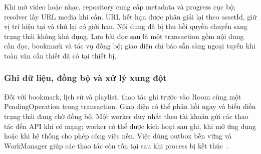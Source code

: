 Khi mở video hoặc nhạc, repository cung cấp metadata và progress cục bộ; resolver lấy URL media khi cần. URL hết hạn được phân giải lại theo assetId, giữ vị trí hiện tại và thử lại có giới hạn. Nội dung đã bị thu hồi quyền chuyển sang trạng thái không khả dụng. Lưu bài đọc sau là một transaction gồm nội dung cần đọc, bookmark và tác vụ đồng bộ; giao diện chỉ báo sẵn sàng ngoại tuyến khi toàn văn cần thiết đã có tại thiết bị.

\subsubsection{Ghi dữ liệu, đồng bộ và xử lý xung đột}
\label{sec:data-synchronization}

Đối với bookmark, lịch sử và playlist, thao tác ghi trước vào Room cùng một PendingOperation trong transaction. Giao diện có thể phản hồi ngay và biểu diễn trạng thái đang chờ đồng bộ. Một worker duy nhất theo tài khoản gửi các thao tác đến API khi có mạng; worker có thể được kích hoạt sau ghi, khi mở ứng dụng hoặc khi hệ thống cho phép công việc nền. Việc dùng outbox bền vững và WorkManager giúp các thao tác còn tồn tại sau khi process bị kết thúc~\cite{android-offline-first,android-workmanager}.

